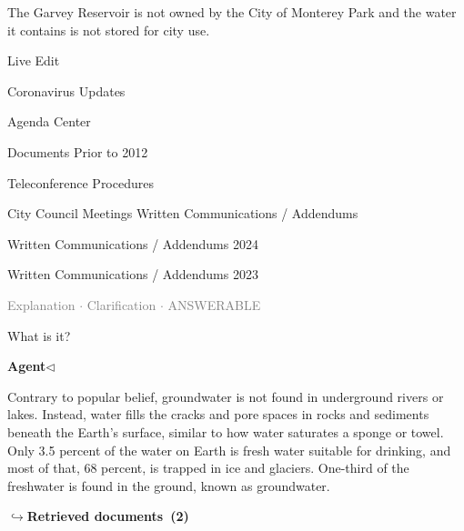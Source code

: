 \documentclass[a4paper,11pt]{article}
\begin{document}
\begin{docenv}
{The Garvey Reservoir is not owned by the City of Monterey Park and the water it contains is not stored for city use.	

Live Edit

 

 

Coronavirus Updates

Agenda Center

Documents Prior to 2012

Teleconference Procedures

City Council Meetings Written Communications / Addendums

Written Communications / Addendums 2024

Written Communications / Addendums 2023}
\end{docenv}
\vspace{0.5em}
\hfill{\tiny\textcolor{gray}{Explanation $\cdot$ Clarification $\cdot$ ANSWERABLE}}
\begin{userbubble}
What is it?
\end{userbubble}
\noindent\hfill{\small\textcolor{agentcolor}{\textbf{Agent\enspace$\triangleleft$}}}
\begin{agentbubble}
Contrary to popular belief, groundwater is not found in underground rivers or lakes. Instead, water fills the cracks and pore spaces in rocks and sediments beneath the Earth's surface, similar to how water saturates a sponge or towel. Only 3.5 percent of the water on Earth is fresh water suitable for drinking, and most of that, 68 percent, is trapped in ice and glaciers. One-third of the freshwater is found in the ground, known as groundwater.
\end{agentbubble}
\noindent\hfill{\footnotesize\textcolor{doccolor}{\textbf{$\hookrightarrow$\enspace Retrieved documents~(2)}}}
\end{document}

